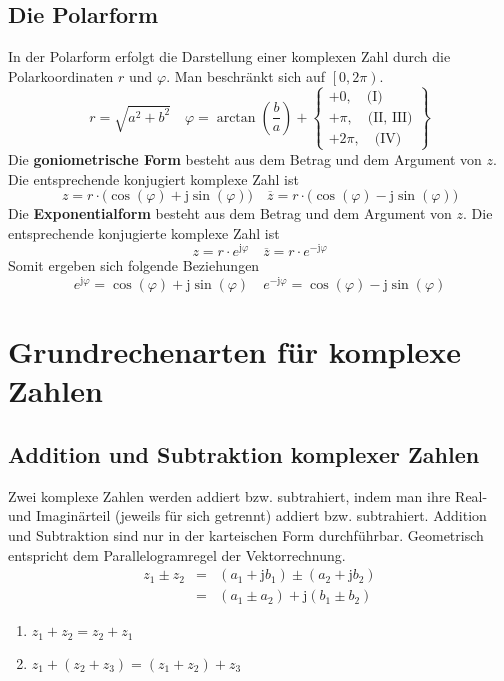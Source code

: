 \subsection{Die Polarform}
In der Polarform erfolgt die Darstellung einer komplexen Zahl durch die Polarkoordinaten $r$ und $\varphi$. Man beschränkt sich auf $\left[0,2\pi\right)$.
\begin{equation}
\boxed{r=\sqrt{a^2+b^2}}\quad \boxed{\varphi=\arctan\left(\dfrac{b}{a}\right)+\left\{\begin{array}{l}+0,\quad \text{(I)}\\+\pi,\quad \text{(II, III)}\\+2\pi,\quad \text{(IV)}\end{array}\right\}}
\end{equation}
Die \textbf{goniometrische Form} besteht aus dem Betrag und dem Argument von $z$. Die entsprechende konjugiert komplexe Zahl ist
\begin{equation}
\boxed{z=r\cdot \Big(\cos\left(\varphi\right)+\text{j}\sin\left(\varphi\right)\Big)}\quad
\boxed{\overline{z}=r\cdot \Big(\cos\left(\varphi\right)-\text{j}\sin\left(\varphi\right)\Big)}
\end{equation}
Die \textbf{Exponentialform} besteht aus dem Betrag und dem Argument von $z$. Die entsprechende konjugierte komplexe Zahl ist
\begin{equation}
\boxed{z=r\cdot e^{\text{j}\varphi}}\quad
\boxed{\overline{z}=r\cdot e^{-\text{j}\varphi}}
\end{equation}
Somit ergeben sich folgende Beziehungen
\begin{equation}
\boxed{e^{\text{j}\varphi}=\cos\left(\varphi\right)+\text{j}\sin\left(\varphi\right)}\quad \boxed{e^{-\text{j}\varphi}=\cos\left(\varphi\right)-\text{j}\sin\left(\varphi\right)}
\end{equation}
\section{Grundrechenarten für komplexe Zahlen}
\subsection{Addition und Subtraktion komplexer Zahlen}
Zwei komplexe Zahlen werden addiert bzw. subtrahiert, indem man ihre Real- und Imaginärteil (jeweils für sich getrennt) addiert bzw. subtrahiert. Addition und Subtraktion sind nur in der karteischen Form durchführbar. Geometrisch entspricht dem Parallelogramregel der Vektorrechnung.
\begin{equation}
\boxed{\begin{array}{lll}
z_1\pm z_2&=&\left(a_1+ \text{j}b_1\right)\pm \left(a_2+ \text{j}b_2\right)\\
&=&\left(a_1\pm a_2\right)+\text{j}\left(b_1\pm b_2\right)
\end{array}}
\end{equation}
\begin{enumerate}[$(i)$]
\item $z_1+z_2=z_2+z_1$
\item $z_1+\left(z_2+z_3\right)=\left(z_1+z_2\right)+z_3$
\end{enumerate}
